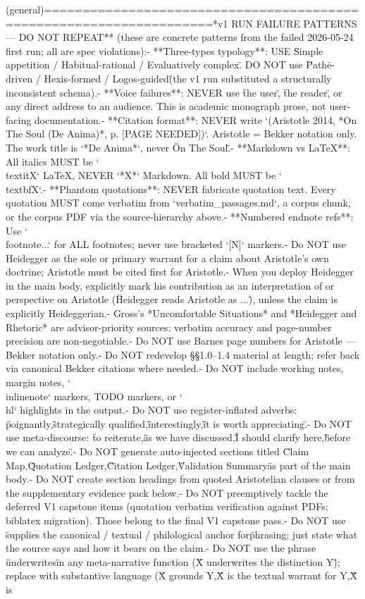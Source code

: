 {(general)\n====================================================================\n\n**v1 RUN FAILURE PATTERNS — DO NOT REPEAT** (these are concrete patterns from the failed 2026-05-24 first run; all are spec violations):\n- **Three-types typology**: USE \"Simple appetition / Habitual-rational / Evaluatively complex\". DO NOT use \"Pathē-driven / Hexis-formed / Logos-guided\" (the v1 run substituted a structurally inconsistent schema).\n- **Voice failures**: NEVER use \"the user\", \"the reader\", or any direct address to an audience. This is academic monograph prose, not user-facing documentation.\n- **Citation format**: NEVER write `(Aristotle 2014, *On The Soul (De Anima)*, p. [PAGE NEEDED])`. Aristotle = Bekker notation only. The work title is `*De Anima*`, never \"On The Soul\".\n- **Markdown vs LaTeX**: All italics MUST be `\\textit{X}` LaTeX, NEVER `*X*` Markdown. All bold MUST be `\\textbf{X}`.\n- **Phantom quotations**: NEVER fabricate quotation text. Every quotation MUST come verbatim from `verbatim_passages.md`, a corpus chunk, or the corpus PDF via the source-hierarchy above.\n- **Numbered endnote refs**: Use `\\footnote{...}` for ALL footnotes; never use bracketed `[N]` markers.\n\n- Do NOT use Heidegger as the sole or primary warrant for a claim about Aristotle's own doctrine; Aristotle must be cited first for Aristotle.\n- When you deploy Heidegger in the main body, explicitly mark his contribution as an interpretation of or perspective on Aristotle (\"Heidegger reads Aristotle as ...\"), unless the claim is explicitly Heideggerian.\n- Gross's *Uncomfortable Situations* and *Heidegger and Rhetoric* are advisor-priority sources: verbatim accuracy and page-number precision are non-negotiable.\n- Do NOT use Barnes page numbers for Aristotle — Bekker notation only.\n- Do NOT redevelop §§1.0–1.4 material at length; refer back via canonical Bekker citations where needed.\n- Do NOT include working notes, margin notes, `\\inlinenote{}` markers, TODO markers, or `\\hl{}` highlights in the output.\n- Do NOT use register-inflated adverbs: \"poignantly,\" \"strategically qualified,\" \"interestingly,\" \"it is worth appreciating.\"\n- Do NOT use meta-discourse: \"to reiterate,\" \"as we have discussed,\" \"I should clarify here,\" \"before we can analyze.\"\n- Do NOT generate auto-injected sections titled \"Claim Map,\" \"Quotation Ledger,\" \"Citation Ledger,\" \"Validation Summary\" as part of the main body.\n- Do NOT create section headings from quoted Aristotelian clauses or from the supplementary evidence pack below.\n- Do NOT preemptively tackle the deferred V1 capstone items (quotation verbatim verification against PDFs; biblatex migration). Those belong to the final V1 capstone pass.\n- Do NOT use \"supplies the canonical / textual / philological anchor for\" phrasing; just state what the source says and how it bears on the claim.\n- Do NOT use the phrase \"underwrites\" in any meta-narrative function (\"X underwrites the distinction Y\"); replace with substantive language (\"X grounds Y,\" \"X is the textual warrant for Y,\" \"X is }
